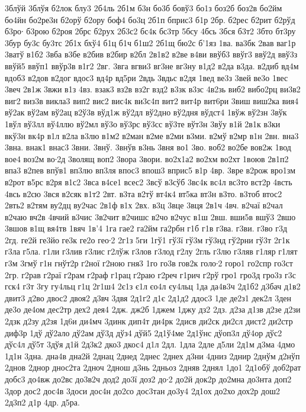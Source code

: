{3блўй
3блўя
б2лок
блу3
2б4ль
2б1м
б3н
бо3б
бовў3
бо1з
боз2б
боз2в
бо2йм
бо4йн
бо2ре3н
б2орў
б2ору
боф4
бо3ц
2б1п
бприс3
б1р
2бр.
б2рес
б2рит
б2рўд
б3ро∙
б3рою
б2роя
2брс
б2рух
2б3с2
бс4к
бс3тр
5бсу
4бсь
3бся
б3т2
3бто
бт3ру
3бур
бу3с
бу3тс
2б1х
бхў4
б1ц
б1ч
б1ш2
2б1щ
бю2с
б'1яз
1ва.
ва3бк
2вав
ваг1р
3ватў
в1б2
3вба
в3бе
в2бив
в2бир
в2бл
2в1в2
в2ве
в4ви
ввўб3
ввўг3
ввў2д
ввў3з
ввўй5
ввўп1
ввўр3в
в1г2
2вг.
3вга
вгви3
вг3не
вг3ну
в1д2
в2да
в3да.
в2диб
вд4м
вдоб3
в2дов
в2дог
вдос3
вд4р
вд5ри
2вдь
3вдьс
в2дя
1вед
ве3з
3вей
ве3о
1вес
3веч
2в1ж
3вжи
в1з
4вз.
взак3
вз2в
вз2г
взд2
в3зк
в3зс
4в2зь
виб2
вибо2рц
ви3в2
виг2
виз3в
викла3
вип2
вис2
вис4к
ви3с4п
вит2
вит4р
вит6ри
3виш
виш2ка
вия4
вў2ак
вў2ам
вў2ац
в2ў3в
вўд1ж
вў2дл
вў2дно
вў2дня
вўдст4
1вўж
вў2зн
3вўк
1вўл
вў3лл
вў4ллю
вў2мл
вў3о
вў3рс
вў3сс
вў3те
вўт3н
3вўу
в1й
2в1к
в3ки
вкў3н
вк4р
в1л
в2ла
в3лю
в1м2
в2ман
в2ме
в2ми
в3ми.
в2мў
в2мр
в1н
2вн.
вна3
3вна.
внак1
внас3
3вни.
3внў.
3внўв
в3нь
3вня
во1
3во.
воб2
во2бе
вов2ж
1вод
вое4
воз2м
во∙2д
3волящ
воп2
3вора
3вори.
во2х1а2
во2хм
во2хт
1воюв
2в1п2
впа3
в2пев
впўв1
вп3лю
вп3ля
впос3
впош3
вприс5
в1р
4вр.
3вре
в2рож
вро1зм
в2рот
в5рс
в2ря
в1с2
3вса
в4се1
всес2
3всў
в3сўб
3вс4к
вс4л
вс3то
вст2р
4всть
4всь
в2сю
3вся
в2сяк
в1т2
2вт.
в3та
в2тў
вт4к4
вт5ка
вт3н
в3то.
в3тоб
втос2
2вть2
в2тям
ву2дц
ву2час
2в1ф
в1х
2вх.
в3ц
3вце
3вця
2в1ч
4вч.
в2чаї
в2чал
в2чаю
вч2в
4вчий
в3чис
3в2чит
в2чишс
в2чо
в2чус
в1ш
2вш.
вши5в
вшў3
2вшо
3вшов
в1щ
вя4тв
1вяч
1в'4
1га
гае2
га2йм
га2рбн
г1б
г1в
г3ва.
г3ви.
г3во
г3д
2гд.
ге2й
ге3йо
ге3к
ге2о
гео∙2
2г1з
5ги
1гў1
гў3ї
гў3м
гў3нд
гў2рни
гў3т
2г1к
г3ла
г5ла.
г1ли
г3лив
г3лис
г2лўж
г3лов
г3лод
г2лу
2гль
г3лю
г3ляв
г1ляр
г1лят
г3м
3гмў
г1н
гнўт2р
г2ної
г2ною
гня3
1го
го3в
гов2к
голо∙2
горо1
го2спр
го3ст
2гр.
г2рав
г2раї
г2рам
г2раф
г1рац
г2раю
г2реч
г1рич
г2рў
гро1
гро3д
гро3з
г3с
гск4
г3т
3гу
гу4льц
г1ц
2г1ш4
2є1з
є1л
єо4л
єу4льц
1да
да4в3ч
2д1б2
д3бач
д1в2
двит3
д2во
двос2
двоя2
д3вч
3двя
2д1г2
д1є
2д1д2
ддос3
1де
де2з1
дек2л
3ден
де3о
де4ом
дес2тр
дех2
дея4
2дж.
дж2б
1джем
1джу
дз2
2дз.
д2за
д1зв
д2зе
д2зи
2дзк
д2зу
д2зя
1д6и
ди4мч
3динк
дип4т
ди4рк
2дисв
ди2ск
ди2сл
дист2
ди2стр
диф3р
1дў
дў2ало
дў2ам
дў3д
дўз4
дўй5
2д1ў4ме
2д1ўнс
дўоп3л
дў4ор
дўс2
дўс4л
дў5т
3дўя
д1й
2д3к2
дко3
дкос4
д1л
2дл.
1дла
2дле
д5ли
2д1м
д3ма
4дмо
1д1н
3дна.
дна4в
дна2й
2днац
2днед
2днес
2днех
д3ни
4дниз
2днир
2днўм
д2нўп
2днов
2днор
днос2та
2дноч
2днош
д3нь
2дньоз
2дняв
2днял
1до1
2д1обў
доб2рат
добс3
до4вж
до2вс
до3в2ч
дод2
до3ї
доз2
до∙2
до2й
док2р
до2мна
до3нта
доп2
3дор
дос2
дос4в
3доси
дос4н
до2со
дос3тан
до3у4
2д1ох
до2хо
дох2р
дош2
2д3п2
д1р
4др.
д5ра.
}
